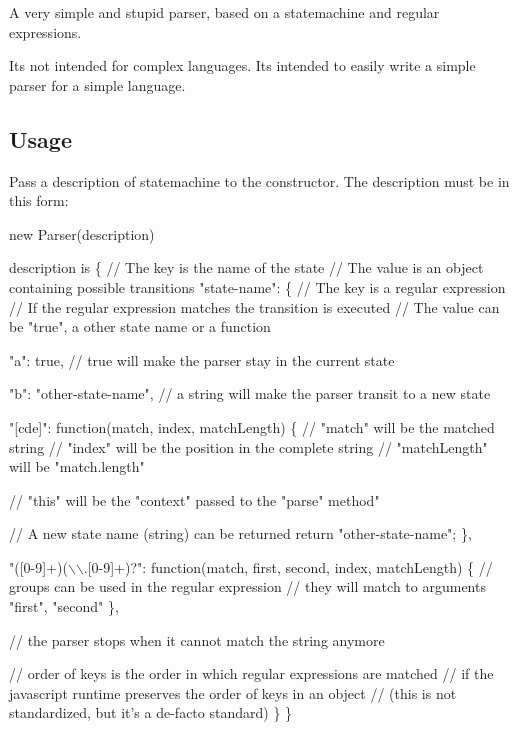 A very simple and stupid parser, based on a statemachine and regular expressions.

It\textquotesingle{}s not intended for complex languages. It\textquotesingle{}s intended to easily write a simple parser for a simple language.

\subsection*{Usage}

Pass a description of statemachine to the constructor. The description must be in this form\+:


\begin{DoxyCode}
new Parser(description)

description is \{
    // The key is the name of the state
    // The value is an object containing possible transitions
    "state-name": \{
        // The key is a regular expression
        // If the regular expression matches the transition is executed
        // The value can be "true", a other state name or a function

        "a": true,
        // true will make the parser stay in the current state

        "b": "other-state-name",
        // a string will make the parser transit to a new state

        "[cde]": function(match, index, matchLength) \{
            // "match" will be the matched string
            // "index" will be the position in the complete string
            // "matchLength" will be "match.length"

            // "this" will be the "context" passed to the "parse" method"

            // A new state name (string) can be returned
            return "other-state-name";
        \},

        "([0-9]+)(\(\backslash\)\(\backslash\).[0-9]+)?": function(match, first, second, index, matchLength) \{
            // groups can be used in the regular expression
            // they will match to arguments "first", "second"
        \},

        // the parser stops when it cannot match the string anymore

        // order of keys is the order in which regular expressions are matched
        // if the javascript runtime preserves the order of keys in an object
        // (this is not standardized, but it's a de-facto standard)
    \}
\}
\end{DoxyCode}


